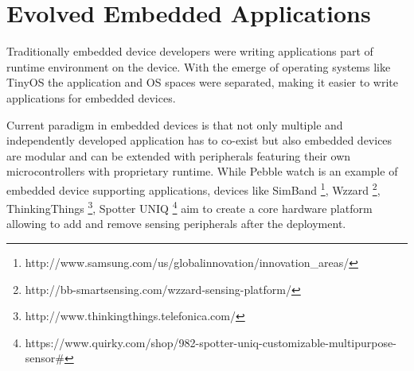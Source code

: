 \section{Evolved Embedded Applications}
Traditionally embedded device developers were writing applications part of
runtime environment on the device. With the emerge of operating systems like
TinyOS the application and OS spaces were separated, making it easier to
write applications for embedded devices. 

Current paradigm in embedded devices is that not only multiple and independently
developed application has to co-exist but also embedded devices are modular and
can be extended with peripherals featuring their own microcontrollers with
proprietary runtime. While Pebble watch is an example of embedded device
supporting applications, devices like SimBand  
\footnote{http://www.samsung.com/us/globalinnovation/innovation_areas/}, Wzzard
\footnote{http://bb-smartsensing.com/wzzard-sensing-platform/}, ThinkingThings
\footnote{http://www.thinkingthings.telefonica.com/}, Spotter UNIQ
\footnote{https://www.quirky.com/shop/982-spotter-uniq-customizable-multipurpose-sensor#}
aim to create a core hardware platform allowing to add and remove sensing
peripherals after the deployment.

